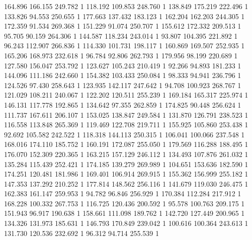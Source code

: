 	164.896	166.155	249.782	1
	118.192	109.853	248.760	1
	138.849	175.219	222.496	1
	133.826	94.553	250.655	1
	177.663	137.432	183.123	1
	162.204	162.203	244.305	1
	172.359	91.534	269.368	1
	151.229	91.074	250.707	1
	155.612	172.332	209.513	1
	95.705	90.159	264.306	1
	144.587	118.234	243.014	1
	93.807	104.395	221.892	1
	96.243	112.907	266.836	1
	114.330	101.731	198.117	1
	160.869	169.507	252.935	1
	165.206	168.973	232.618	1
	96.784	92.806	262.793	1
	179.956	98.199	220.689	1
	127.580	156.047	253.792	1
	123.627	105.243	210.419	1
	92.266	94.893	181.233	1
	144.096	111.186	242.660	1
	154.382	103.433	250.084	1
	98.333	94.941	236.796	1
	124.526	97.430	258.643	1
	123.935	142.117	247.642	1
	94.708	100.923	268.767	1
	121.029	108.211	240.067	1
	122.202	120.511	255.239	1
	169.184	165.317	225.974	1
	146.131	117.778	192.865	1
	134.642	97.355	262.859	1
	174.825	90.448	256.624	1
	111.737	167.611	206.107	1
	153.025	138.847	249.584	1
	131.870	126.791	238.523	1
	116.558	113.848	265.369	1
	119.469	122.708	219.711	1
	155.925	105.860	253.438	1
	92.692	105.582	242.522	1
	118.318	144.113	250.315	1
	106.041	100.066	237.548	1
	168.016	174.110	185.752	1
	160.191	172.087	255.050	1
	179.569	116.288	188.495	1
	176.070	152.309	220.365	1
	163.215	157.129	246.112	1
	134.493	107.876	261.032	1
	135.284	115.439	252.421	1
	174.185	139.279	269.989	1
	104.651	153.636	182.590	1
	174.251	120.481	181.986	1
	169.401	106.914	269.915	1
	155.362	156.999	255.182	1
	147.353	137.292	210.252	1
	177.814	148.562	256.116	1
	141.679	119.030	246.475	1
	162.383	161.147	259.953	1
	94.782	96.846	256.929	1
	170.384	112.284	217.912	1
	168.228	100.332	267.753	1
	116.725	120.436	200.592	1
	95.578	100.763	209.175	1
	151.943	96.917	190.638	1
	158.661	111.098	189.762	1
	142.720	127.449	200.965	1
	134.326	131.973	185.631	1
	146.793	170.849	239.042	1
	100.616	100.364	243.613	1
	131.730	120.536	232.692	1
	96.312	94.714	255.539	1
